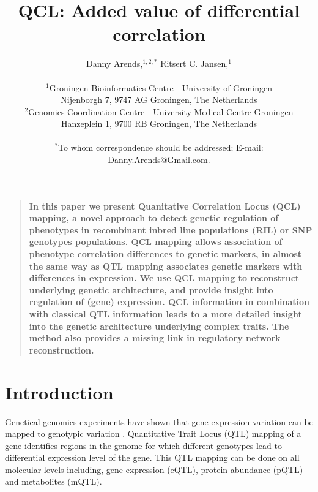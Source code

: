 \documentclass[12pt]{article}
\title{QCL: Added value of differential correlation}
\author
{Danny Arends,$^{1,2,\ast}$ Ritsert C. Jansen,$^{1}$\\
\\
\normalsize{$^{1}$Groningen Bioinformatics Centre - University of Groningen}\\
\normalsize{Nijenborgh 7, 9747 AG Groningen, The Netherlands}\\
\normalsize{$^{2}$Genomics Coordination Centre - University Medical Centre Groningen}\\
\normalsize{Hanzeplein 1, 9700 RB Groningen, The Netherlands}\\
\\
\normalsize{$^\ast$To whom correspondence should be addressed; E-mail:  Danny.Arends@Gmail.com.}
}
\date{}
\newenvironment{sciabstract}{%
\begin{quote} \bf}
{\end{quote}}
\begin{document}

\baselineskip24pt


\maketitle 





\begin{sciabstract}
  In this paper we present Quanitative Correlation Locus (QCL) mapping, a novel approach 
  to detect genetic regulation of phenotypes in recombinant inbred line populations (RIL) 
  or SNP genotypes populations. QCL mapping allows association of phenotype correlation 
  differences to genetic markers, in almost the same way as QTL mapping associates genetic 
  markers with differences in expression.
  We use QCL mapping to reconstruct underlying genetic architecture, and provide insight 
  into regulation of (gene) expression. QCL information in combination with classical QTL 
  information leads to a more detailed insight into the genetic architecture underlying 
  complex traits. The method also provides a missing link in regulatory network reconstruction.
\end{sciabstract}

\section*{Introduction}

  Genetical genomics experiments have shown that gene expression variation can be mapped to 
  genotypic variation \cite{Jansen:2001}. Quantitative Trait Locus (QTL) mapping of a 
  gene identifies regions in the genome for which different genotypes lead to differential 
  expression level of the gene. This QTL mapping can be done on all molecular levels including, 
  gene expression (eQTL), protein abundance (pQTL) and metabolites (mQTL).
\end{document}
